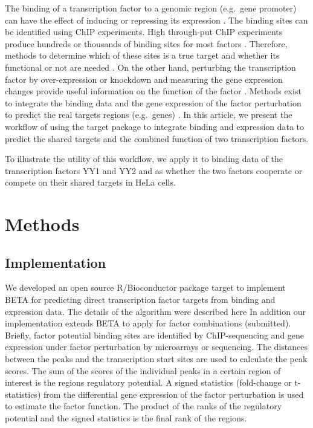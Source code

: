 \documentclass[9pt,a4paper,]{extarticle}
\begin{document}
The binding of a transcription factor to a genomic region (e.g.~gene promoter) can have the effect of inducing or repressing its expression \citet{Latchman2001}. The binding sites can be identified using ChIP experiments. High through-put ChIP experiments produce hundreds or thousands of binding sites for most factors \citet{Johnson2007a}. Therefore, methods to determine which of these sites is a true target and whether its functional or not are needed \citet{Ucar2009}. On the other hand, perturbing the transcription factor by over-expression or knockdown and measuring the gene expression changes provide useful information on the function of the factor \citet{Tran2005}. Methods exist to integrate the binding data and the gene expression of the factor perturbation to predict the real targets regions (e.g.~genes) \citep{Subramanian2005, Wang2013b}. In this article, we present the workflow of using the target package to integrate binding and expression data to predict the shared targets and the combined function of two transcription factors.

To illustrate the utility of this workflow, we apply it to binding data of the transcription factors YY1 and YY2 and as whether the two factors cooperate or compete on their shared targets in HeLa cells.

\hypertarget{methods}{%
\section{Methods}\label{methods}}

\hypertarget{implementation}{%
\subsection{Implementation}\label{implementation}}

We developed an open source R/Bioconductor package target to implement BETA for predicting direct transcription factor targets from binding and expression data. The details of the algorithm were described here \citet{Wang2013b} In addition our implementation extends BETA to apply for factor combinations (submitted). Briefly, factor potential binding sites are identified by ChIP-sequencing and gene expression under factor perturbation by microarrays or sequencing. The distances between the peaks and the transcription start sites are used to calculate the peak scores. The sum of the scores of the individual peaks in a certain region of interest is the regions regulatory potential. A signed statistics (fold-change or t-statistics) from the differential gene expression of the factor perturbation is used to estimate the factor function. The product of the ranks of the regulatory potential and the signed statistics is the final rank of the regions.
\end{document}
